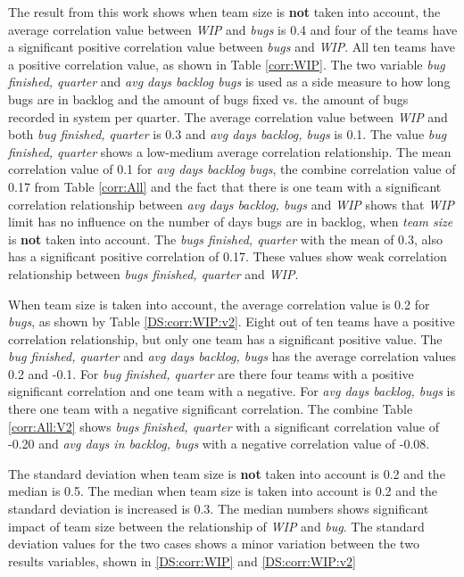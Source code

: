 \documentclass[UKenglish]{ifimaster}  %
\begin{document}
The result from this work shows when team size is \textbf{not} taken into account, the average correlation value between \textit{WIP} and \textit{bugs} is 0.4 and four of the teams have a significant positive correlation value between \textit{bugs} and \textit{WIP}. All ten teams have a positive correlation value, as shown in Table \ref{corr:WIP}. The two variable \textit{bug finished, quarter} and \textit{avg days backlog bugs} is used as a side measure to how long bugs are in backlog and the amount of bugs fixed vs. the amount of bugs recorded in system per quarter. The average correlation value between \textit{WIP} and both \textit{bug finished, quarter} is 0.3 and \textit{avg days backlog, bugs} is 0.1. The value \textit{bug finished, quarter} shows a low-medium average correlation relationship. The mean correlation value of 0.1   for  \textit{avg days backlog bugs}, the combine correlation value of 0.17 from Table \ref{corr:All} and the fact that there is one team with a significant correlation relationship between \textit{avg days backlog, bugs} and \textit{WIP} shows that  \textit{WIP} limit has no influence on the number of days bugs are in backlog, when \textit{team size} is \textbf{not} taken into account. The \textit{bugs finished, quarter} with the mean of 0.3, also has a significant positive correlation of 0.17. These values show weak correlation relationship between \textit{bugs finished, quarter} and \textit{WIP}. 

When team size is taken into account, the average correlation value is 0.2 for \textit{bugs}, as shown by Table \ref{DS:corr:WIP:v2}.  Eight out of ten teams have a positive correlation relationship, but only one team has a significant positive value. The  \textit{bug finished, quarter} and \textit{avg days backlog, bugs}  has the average correlation values 0.2 and -0.1. For \textit{bug finished, quarter} are there four teams with a positive significant correlation and one team with a negative. For \textit{avg days backlog, bugs} is there one team with a negative significant correlation. The combine Table \ref{corr:All:V2} shows \textit{bugs finished, quarter} with a significant correlation value of -0.20 and \textit{avg days in backlog, bugs} with a negative correlation value of -0.08.

The standard deviation when team size is \textbf{not} taken into account is 0.2 and the median is 0.5. The median when team size is taken into account is 0.2 and the standard deviation is increased is 0.3. The median numbers shows significant impact of team size between the relationship of \textit{WIP} and \textit{bug}. The standard deviation values for the two cases shows a minor variation between the two results variables, shown in \ref{DS:corr:WIP} and \ref{DS:corr:WIP:v2}    
\end{document}
